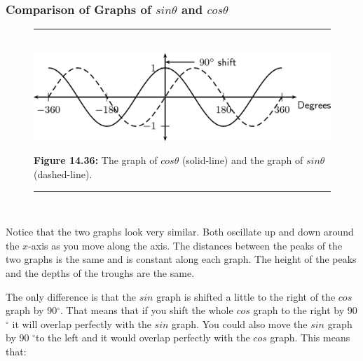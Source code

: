             \subsubsection{ Comparison of Graphs of $sin\theta $ and $cos\theta $}
            \nopagebreak
    \setcounter{subfigure}{0}
	\begin{figure}[H] %
    \begin{center}
    \rule[.1in]{\figurerulewidth}{.005in} \\
        \label{m39414*uid69!!!underscore!!!media}\label{m39414*uid69!!!underscore!!!printimage}\includegraphics{col11306.imgs/m39414_MG10C15_030.png} %
      \vspace{2pt}
    \vspace{\rubberspace}\par \begin{cnxcaption}
	  \small \textbf{Figure 14.36: }The graph of $cos\theta $ (solid-line) and the graph of $sin\theta $ (dashed-line).
	\end{cnxcaption}
    \vspace{.1in}
    \rule[.1in]{\figurerulewidth}{.005in} \\
    \end{center}
 \end{figure}       
        \label{m39414*id88718}Notice that the two graphs look very similar. Both oscillate up and down around the $x$-axis as you move along the axis. The distances between the peaks of the two graphs is the same and is constant along each graph. The height of the peaks and the depths of the troughs are the same.\par 
        \label{m39414*id88733}The only difference is that the $sin$ graph is shifted a little to the right of the $cos$ graph by 90${}^{\circ }$. That means that if you shift the whole $cos$ graph to the right by 90 ${}^{\circ }$ it will overlap perfectly with the $sin$ graph. You could also move the $sin$ graph by 90 ${}^{\circ }$to the left and it would overlap perfectly with the $cos$ graph. This means that:\par 
